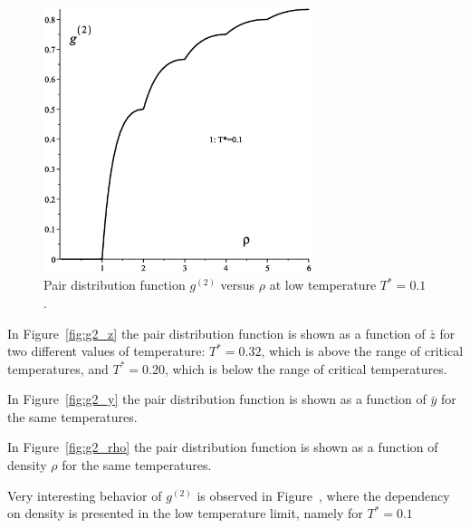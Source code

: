 \begin{figure}[htbp]
	\includegraphics[width=0.7\textwidth,angle=0]{g2_vs_rho_low_temp}
	\caption{Pair distribution function $g^{(2)}$ versus $\rho$ at low temperature $T^*=0.1$.}
	\label{fig:g2_rho_low_temp}
\end{figure}

In Figure~\ref{fig:g2_z} the pair distribution function is shown as a function of $\bar{z}$ for two different values of temperature: $T^*=0.32$, which is above the range of critical temperatures, and $T^*=0.20$, which is below the range of critical temperatures. 

In Figure~\ref{fig:g2_y} the pair distribution function is shown as a function of $\bar{y}$ for the same temperatures.

In Figure~\ref{fig:g2_rho} the pair distribution function is shown as a function of density $\rho$ for the same temperatures.

Very interesting behavior of $g^{(2)}$ is observed in Figure~, where the dependency on density is presented in the low temperature limit, namely for $T^*=0.1$ 


